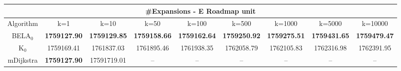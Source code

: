 \begin{tabular}{c|cccccccc}\toprule
\multicolumn{9}{c}{#Expansions - E Roadmap unit}\\ \midrule
Algorithm & k=1 & k=10 & k=50 & k=100 & k=500 & k=1000 & k=5000 & k=10000 \\ \midrule
BELA$_0$ & \textbf{1759127.90} & \textbf{1759129.85} & \textbf{1759158.66} & \textbf{1759162.64} & \textbf{1759250.92} & \textbf{1759275.51} & \textbf{1759431.65} & \textbf{1759479.47} \\
K$_0$ & 1759169.41 & 1761837.03 & 1761895.46 & 1761938.35 & 1762058.79 & 1762105.83 & 1762316.98 & 1762391.95 \\
mDijkstra & \textbf{1759127.90} & 17591719.01 & -- & -- & -- & -- & -- & -- \\ \bottomrule 
\end{tabular}
